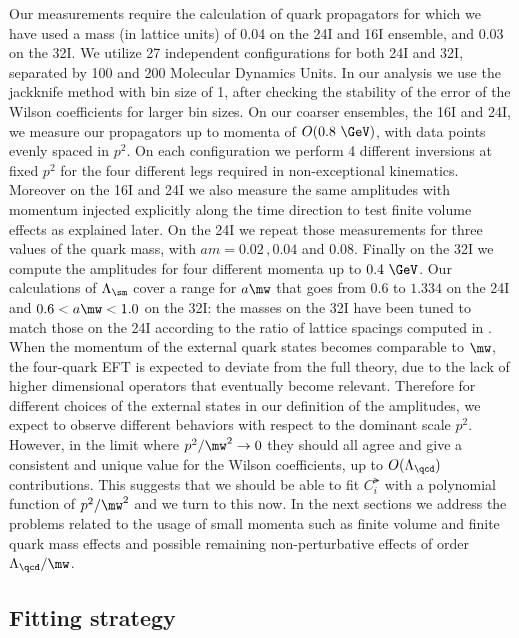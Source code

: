 \documentclass[aps,prd,twocolumn,nofootinbib,showpacs,superscriptaddress]{revtex4-1}
\begin{document}
Our measurements require the calculation of quark propagators for which we have used a 
mass (in lattice units) of 0.04 on the 24I and 16I ensemble, and 0.03 on the 32I.
We utilize 27 independent configurations for both 24I and 32I, 
separated by 100 and 200 Molecular Dynamics Units.
In our analysis we use the jackknife method with bin size of 1,
after checking the stability of the error of the Wilson coefficients
for larger bin sizes.
On our coarser ensembles, the 16I and 24I, we measure our propagators
up to momenta of $O(0.8~\GeV)$, with data points evenly spaced in $p^2$.
On each configuration we perform 4 different inversions at fixed $p^2$ for the
four different legs required in non-exceptional kinematics.
Moreover on the 16I and 24I we also measure the same amplitudes with 
momentum injected explicitly along the time direction to test finite volume 
effects as explained later. On the 24I we repeat those measurements for three
values of the quark mass, with $am=0.02\,, 0.04$ and 0.08.
Finally on the 32I we compute the amplitudes for four different momenta
up to $0.4~\GeV$.
Our calculations of $\Lambda_\sm$ cover a range for $a \mw$ 
that goes from $0.6$ to $1.334$ on the 24I and
$0.6 < a \mw < 1.0$ on the 32I: the masses on the 32I have been tuned to match those
on the 24I according to the ratio of lattice spacings computed in .\\

When the momentum of the external quark states becomes comparable to $\mw$, the four-quark EFT
is expected to deviate from the full theory, due to the lack of higher dimensional operators
that eventually become relevant. Therefore for different choices of the external states in our definition
of the amplitudes, we expect to observe different behaviors with respect to the dominant scale $p^2$. 
However, in the limit where $p^2 / \mw^2 \to 0$ 
they should all agree and give a consistent
and unique value for the Wilson coefficients, up to $O(\Lambda_\qcd)$ contributions. 
This suggests that we should be able to fit $C_i^\lat$ with a polynomial 
function of $p^2/\mw^2$ and we turn to this now.
In the next sections we address 
the problems related to the usage of small momenta 
such as finite volume and finite quark mass effects
and possible remaining
non-perturbative effects of order $\Lambda_\qcd / \mw$.


\subsection{Fitting strategy}
\end{document}
